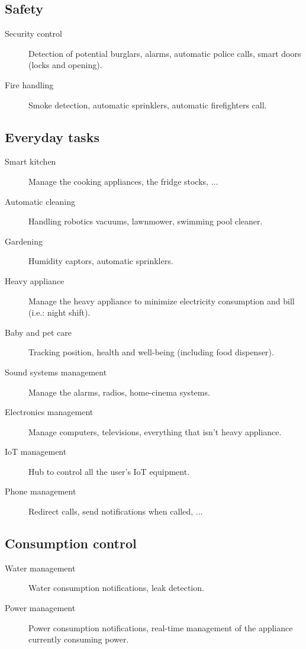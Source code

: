         \subsection{Safety}
            \begin{description}
                \item[Security control] Detection of potential burglars, alarms, automatic police calls, smart doors (locks and opening).
                \item[Fire handling] Smoke detection, automatic sprinklers, automatic firefighters call.
            \end{description}

        \subsection{Everyday tasks}
            \begin{description}
                \item[Smart kitchen] Manage the cooking appliances, the fridge stocks, ...
                \item[Automatic cleaning] Handling robotics vacuums, lawnmower, swimming pool cleaner.
                \item[Gardening] Humidity captors, automatic sprinklers.
                \item[Heavy appliance] Manage the heavy appliance to minimize electricity consumption and bill (i.e.: night shift).
                \item[Baby and pet care] Tracking position, health and well-being (including food dispenser).
                \item[Sound systems management] Manage the alarms, radios, home-cinema systems.
                \item[Electronics management] Manage computers, televisions, everything that isn't heavy appliance.
                \item[IoT management] Hub to control all the user's IoT equipment.
                \item[Phone management] Redirect calls, send notifications when called, ...
            \end{description}

        \subsection{Consumption control}
            \begin{description}
                \item[Water management] Water consumption notifications, leak detection.
                \item[Power management] Power consumption notifications, real-time management of the appliance currently consuming power.
            \end{description}


